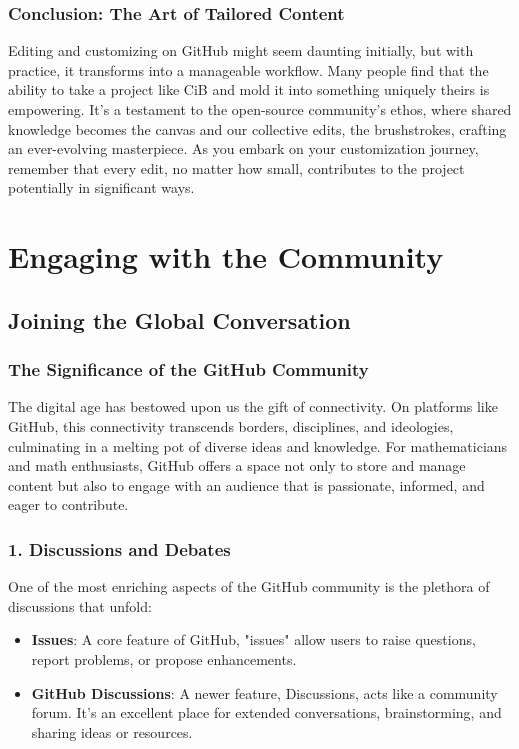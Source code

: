 \documentclass[a4paper,12pt]{book}
\newcounter{problem}
\begin{document}
\subsection*{Conclusion: The Art of Tailored Content}
Editing and customizing on GitHub might seem daunting initially, but with practice, it transforms into a manageable workflow. Many people find that the ability to take a project like CiB and mold it into something uniquely theirs is empowering. It's a testament to the open-source community's ethos, where shared knowledge becomes the canvas and our collective edits, the brushstrokes, crafting an ever-evolving masterpiece. As you embark on your customization journey, remember that every edit, no matter how small, contributes to the project potentially in significant ways.

\chapter{Engaging with the Community}
\section*{Joining the Global Conversation}

\subsection*{The Significance of the GitHub Community}
The digital age has bestowed upon us the gift of connectivity. On platforms like GitHub, this connectivity transcends borders, disciplines, and ideologies, culminating in a melting pot of diverse ideas and knowledge. For mathematicians and math enthusiasts, GitHub offers a space not only to store and manage content but also to engage with an audience that is passionate, informed, and eager to contribute.

\subsection*{1. Discussions and Debates}
One of the most enriching aspects of the GitHub community is the plethora of discussions that unfold:

\begin{itemize}
    \item \textbf{Issues}: A core feature of GitHub, "issues" allow users to raise questions, report problems, or propose enhancements. 
    \item \textbf{GitHub Discussions}: A newer feature, Discussions, acts like a community forum. It's an excellent place for extended conversations, brainstorming, and sharing ideas or resources.
\end{itemize}
\end{document}
